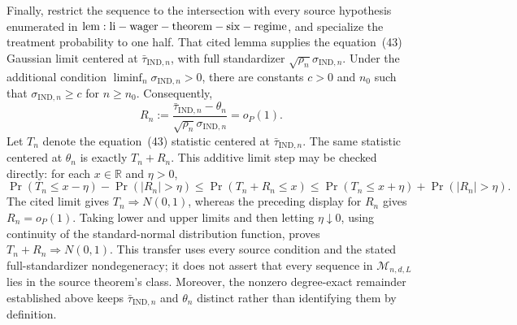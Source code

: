 Finally, restrict the sequence to the intersection with every source hypothesis enumerated in \({\rm lem:li-wager-theorem-six-regime}\), and specialize the treatment probability to one half.  That cited lemma supplies the equation~(43) Gaussian limit centered at \(\bar\tau_{\mathrm{IND},n}\), with full standardizer \(\sqrt{\rho_n}\sigma_{\mathrm{IND},n}\).  Under the additional condition \(\liminf_n\sigma_{\mathrm{IND},n}>0\), there are constants \(c>0\) and \(n_0\) such that \(\sigma_{\mathrm{IND},n}\ge c\) for \(n\ge n_0\).  Consequently,
\[
 R_n:=\frac{\bar\tau_{\mathrm{IND},n}-\theta_n}
 {\sqrt{\rho_n}\sigma_{\mathrm{IND},n}}=o_P(1).
\]
Let \(T_n\) denote the equation~(43) statistic centered at \(\bar\tau_{\mathrm{IND},n}\).  The same statistic centered at \(\theta_n\) is exactly \(T_n+R_n\).  This additive limit step may be checked directly: for each \(x\in\mathbb R\) and \(\eta>0\),
\[
 \Pr(T_n\le x-\eta)-\Pr(|R_n|>\eta)
 \le\Pr(T_n+R_n\le x)
 \le\Pr(T_n\le x+\eta)+\Pr(|R_n|>\eta).
\]
The cited limit gives \(T_n\Rightarrow N(0,1)\), whereas the preceding display for \(R_n\) gives \(R_n=o_P(1)\).  Taking lower and upper limits and then letting \(\eta\downarrow0\), using continuity of the standard-normal distribution function, proves \(T_n+R_n\Rightarrow N(0,1)\).  This transfer uses every source condition and the stated full-standardizer nondegeneracy; it does not assert that every sequence in \(\mathcal M_{n,d,L}\) lies in the source theorem's class.  Moreover, the nonzero degree-exact remainder established above keeps \(\bar\tau_{\mathrm{IND},n}\) and \(\theta_n\) distinct rather than identifying them by definition.